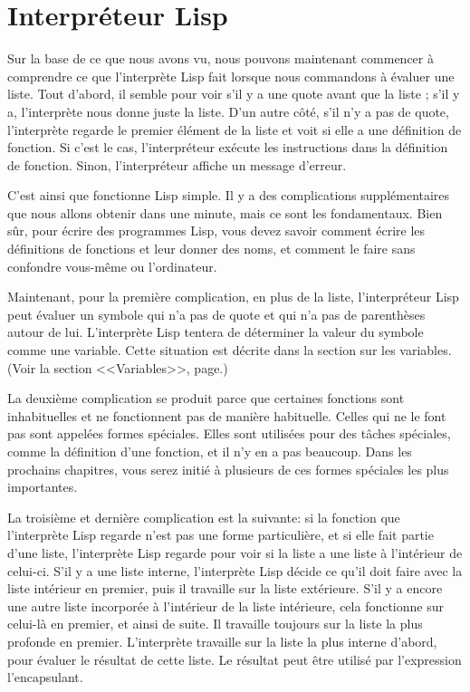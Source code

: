 \section{Interpréteur Lisp}

Sur la base de ce que nous avons vu, nous pouvons maintenant commencer
à comprendre ce que l'interprète Lisp fait lorsque nous commandons à
évaluer une liste. Tout d'abord, il semble pour voir s'il y a une
quote avant que la liste ; s'il y a, l'interprète nous donne juste
la liste. D'un autre côté, s'il n'y a pas de quote, l'interprète
regarde le premier élément de la liste et voit si elle a une
définition de fonction. Si c'est le cas, l'interpréteur exécute les
instructions dans la définition de fonction. Sinon, l'interpréteur
affiche un message d'erreur. 

C'est ainsi que fonctionne Lisp simple. Il y a des complications
supplémentaires que nous allons obtenir dans une minute, mais ce sont
les fondamentaux. Bien sûr, pour écrire des programmes Lisp, vous
devez savoir comment écrire les définitions de fonctions et leur
donner des noms, et comment le faire sans confondre vous-même ou
l'ordinateur. 

Maintenant, pour la première complication, en plus de la liste,
l'interpréteur Lisp peut évaluer un symbole qui n'a pas de quote et
qui n'a pas de parenthèses autour de lui. L'interprète Lisp tentera de
déterminer la valeur du symbole comme une variable. Cette situation
est décrite dans la section sur les variables. (Voir la
section <<Variables>>, page.)

La deuxième complication se produit parce que certaines fonctions sont
inhabituelles et ne fonctionnent pas de manière habituelle. Celles qui
ne le font pas sont appelées formes spéciales. Elles sont utilisées
pour des tâches spéciales, comme la définition d'une fonction, et il
n'y en a pas beaucoup. Dans les prochains chapitres, vous serez initié
à plusieurs de ces formes spéciales les plus importantes. 

La troisième et dernière complication est la suivante: si la fonction
que l'interprète Lisp regarde n'est pas une forme particulière, et si
elle fait partie d'une liste, l'interprète Lisp regarde pour voir si
la liste a une liste à l'intérieur de celui-ci. S'il y a une liste
interne, l'interprète Lisp décide ce qu'il doit faire avec la
liste intérieur en premier, puis il travaille sur la liste
extérieure. S'il y a encore une autre liste incorporée à l'intérieur
de la liste intérieure, cela fonctionne sur celui-là en premier, et
ainsi de suite. Il travaille toujours sur la liste la plus profonde en
premier. L'interprète travaille sur la liste la plus interne d'abord,
pour évaluer le résultat de cette liste. Le résultat peut être utilisé
par l'expression l'encapsulant.

